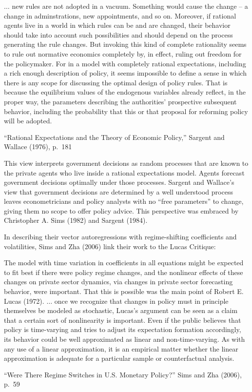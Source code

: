 \epigraph{$\ldots$ new rules are not adopted
in a vacuum. Something would cause the change -- a change in adminstrations,
new appointments, and so on. Moreover, if rational agents live in a world in
which rules can be and are changed, their behavior should take into account such
possibilities and should depend on the process generating the rule changes. But
invoking this kind of complete rationality seems to rule out normative economics
completely by, in effect, ruling out freedom for the policymaker. For in a model
with completely rational expectations, including a rich enough description
of policy, it seems impossible to define a sense in which there is any scope for
discussing the optimal design of policy rules. That is because the equilibrium
values of the endogenous variables already reflect, in the proper way, the
parameters
describing the authorities' prospective subsequent behavior, including
the probability that this or that proposal for reforming policy will be adopted.}{``Rational Expectations and the Theory of Economic Policy,''
Sargent and Wallace (1976), p.~181}


%
%

This view interprets  government decisions as  random  processes
 that are known to the private agents who  live inside a rational expectations model.  
 Agents forecast   government decisions optimally  under those processes.
 Sargent and Wallace's   view that  government decisions  are
determined by a well understood process  leaves  econometricians and policy analysts with
 no ``free parameters'' to change, giving them no scope  to offer policy advice.
This perspective  was embraced  by
 Christopher A. Sims (1982) and Sargent (1984).
 
%
%

In describing  their vector autoregressions with regime-shifting coefficients and volatilities, Sims and Zha (2006)  link
their work to the Lucas Critique: %
\epigraph
{The model with time variation in coefficients in all equations might be expected to fit best if there 
were policy regime changes, and the nonlinear effects of these changes on private sector dynamics, via
 changes in private sector forecasting behavior, were important. That this is possible was the main point 
 of Robert E. Lucas (1972).
$\ldots$ %
once we recognize that changes in policy must in principle themselves be modeled as 
stochastic, Lucas's argument can be seen as a claim that a certain sort of nonlinearity is important. Even if the public believes that policy is time-varying and tries to adjust its expectation formation accordingly, its behavior could be well approximated as linear and non-time-varying. As with any use of a linear approximation, it is an empirical matter whether the linear approximation is adequate for a particular sample or counterfactual analysis.}{``Were There Regime  Switches in U.S. Monetary Policy?'' Sims and Zha (2006), p.~59}


